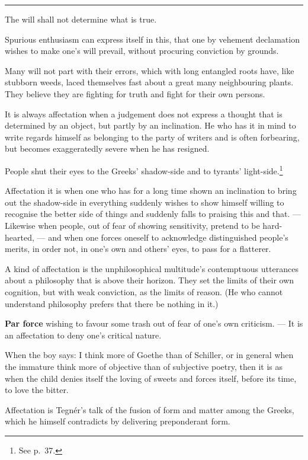 \documentclass[12pt]{article}
\newcommand{\opage}[1]{\marginnote{\footnotesize\textit{[#1]}}}
\newcommand{\ombreak}{\par\medskip\begin{center}\rule{0.32\textwidth}{0.4pt}\end{center}\medskip}
\begin{document}
\ombreak

The will shall not determine what is true.

Spurious enthusiasm can express itself in this, that one by vehement declamation wishes to make one's will prevail, without procuring conviction by grounds.

Many will not part with their errors, which with long entangled roots have, like stubborn weeds, laced themselves fast about a great many neighbouring plants. They believe they are fighting for truth and fight for their own persons.

It is always affectation when a judgement does not express a thought that is determined by an object, but partly by an inclination. He who has it in mind to write regards himself as belonging to the party of writers and is often forbearing, but becomes exaggeratedly severe when he has resigned.

People shut their eyes to the Greeks' shadow-side and to tyrants' light-side.\footnote{See p.\ 37.}

Affectation it is when one who has for a long time shown an inclination to bring out the shadow-side in everything suddenly wishes to show himself willing to recognise the better side of things and suddenly falls to praising this and that. --- Likewise when people, out of fear of showing sensitivity, pretend to be hard-hearted, --- and \opage{184}when one forces oneself to acknowledge distinguished people's merits, in order not, in one's own and others' eyes, to pass for a flatterer.

A kind of affectation is the unphilosophical multitude's contemptuous utterances about a philosophy that is above their horizon. They set the limits of their own cognition, but with weak conviction, as the limits of reason. (He who cannot understand philosophy prefers that there be nothing in it.)

\textbf{Par force} wishing to favour some trash out of fear of one's own criticism. --- It is an affectation to deny one's critical nature.

When the boy says: I think more of Goethe than of Schiller, or in general when the immature think more of objective than of subjective poetry, then it is as when the child denies itself the loving of sweets and forces itself, before its time, to love the bitter.

Affectation is Tegnér's talk of the fusion of form and matter among the Greeks, which he himself contradicts by delivering preponderant form.
\end{document}
